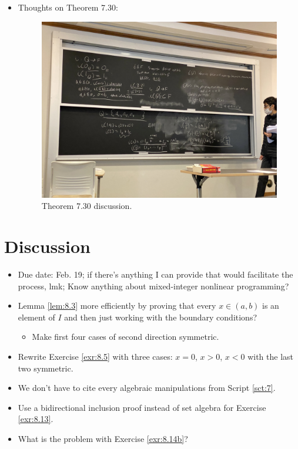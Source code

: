 \documentclass{report}
\begin{document}
\begin{itemize}
    \item {}Thoughts on Theorem 7.30:
    \begin{figure}[h!]
        \centering
        \includegraphics[width=0.5\linewidth]{ExtFiles/theorem7-30.JPG}
        \caption{Theorem 7.30 discussion.}
        \label{fig:theorem7-30}
    \end{figure}
\end{itemize}






\section{Discussion}
\begin{itemize}
    \item {}Due date: Feb. 19; if there's anything I can provide that would facilitate the process, lmk; Know anything about mixed-integer nonlinear programming?
    \item Lemma \ref{lem:8.3} more efficiently by proving that every $x\in(a,b)$ is an element of $I$ and then just working with the boundary conditions?
    \begin{itemize}
        \item Make first four cases of second direction symmetric.
    \end{itemize}
    \item Rewrite Exercise \ref{exr:8.5} with three cases: $x=0$, $x>0$, $x<0$ with the last two symmetric.
    \item We don't have to cite every algebraic manipulations from Script \ref{sct:7}.
    \item {}Use a bidirectional inclusion proof instead of set algebra for Exercise \ref{exr:8.13}.
    \item What is the problem with Exercise \ref{exr:8.14b}?
\end{itemize}
\end{document}
